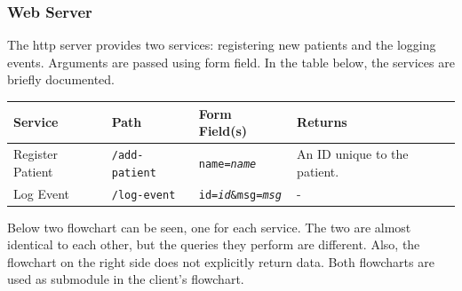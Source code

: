 
\subsubsection{Web Server}

The \gls{http} server provides two services: registering new patients and the logging events.
Arguments are passed using form field. In the table below, the services are briefly documented.

\begin{center}
    \begin{tabular}{l|l|l|l}
        Service & Path & Form Field(s) & Returns \\
        \hline
        Register Patient & \texttt{/add-patient} & \texttt{name=\textit{name}} & An ID unique to the patient. \\
        \hline
        Log Event & \texttt{/log-event} & \texttt{id=\textit{id}\&msg=\textit{msg}} & - \\
    \end{tabular}
\end{center}

\noindent
Below two flowchart can be seen, one for each service.
The two are almost identical to each other, but the queries they perform are different.
Also, the flowchart on the right side does not explicitly return data. 
Both flowcharts are used as submodule in the client's flowchart.

